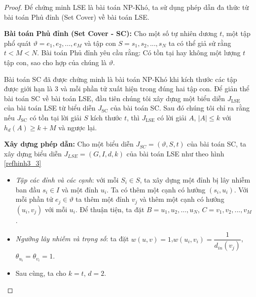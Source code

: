 \begin{proof}
	Để chứng minh LSE là bài toán NP-Khó, ta sử dụng phép dẫn đa thức từ bài toán Phủ đỉnh (Set Cover) về bài toán LSE. 
	
	{\bfseries Bài toán Phủ đỉnh (Set Cover - SC):} Cho một số tự nhiên dương $t$, một tập phổ quát $\vartheta = {e_{1}, e_{2}, ... ,e_{M}}$ và tập con $S = {s_{1}, s_{2}, ... , s_{N}}$ ta có thể giả sử rằng $t < M < N$. Bài toán Phủ đỉnh yêu cầu rằng: Có tồn tại hay không một lượng $t$ tập con, sao cho hợp của chúng là $\vartheta$.
	
	Bài toán SC đã được chứng minh là bài toán NP-Khó khi kích thước các tập được giới hạn là 3 và mỗi phần tử xuất hiện trong đúng hai tập con. Để giản thể bài toán SC về bài toán LSE, đầu tiên chúng tôi xây dựng một biểu diễn $J_{\text{LSE}}$ của bài toán LSE từ biểu diễn $J_{\text{SC}}$ của bài toán SC. Sau đó chúng tôi chỉ ra rằng nếu $J_{\text{SC}}$ có tồn tại lời giải $S$ kích thước $t$, thì $J_{\text{LSE}}$ có lời giải $A$, $| A | \leq k$ với $h_{d}(A) \geq k + M$ và ngược lại.
	
	{\bfseries Xây dựng phép dẫn:} Cho một biểu diễn $J_{SC} = (\vartheta, S, t)$ của bài toán SC, ta xây dựng biểu diễn $J_{LSE} = (G, I, d, k)$ của bài toán LSE như theo hình \ref{refhinh3_3}
	\begin {itemize}
	\item {\itshape Tập các đỉnh và các cạnh}: với mỗi $S_{i} \in S$, ta xây dựng một đỉnh bị lây nhiễm ban đầu $s_{i} \in I$ và một đỉnh $u_{i}$. Ta có thêm một cạnh có hướng $(s_{i}, u_{i})$. Với mỗi phần tử $e_{j} \in \vartheta$ ta thêm một đỉnh $v_{j}$ và thêm một cạnh có hướng $(u_{i},v_{j})$ với mỗi $u_{i}$. Để thuận tiện, ta đặt $B = {u_{1}, u_{2}, ... , u_{N}}$, $C = {v_{1}, v_{2}, ... , v_{M}}$.
	
	\item {\itshape Ngưỡng lây nhiễm và trọng số}: ta đặt $w(u,v) = 1$,\linebreak $w(u_{i}, v_{i}) = \dfrac{1}{d_{in}(v_{j})}$, $\theta_{u_{i}} = \theta_{v_{i}} = 1$.
	
	\item Sau cùng, ta cho $k = t$, $d = 2$. 		
	

\end{itemize}
\end{proof}
